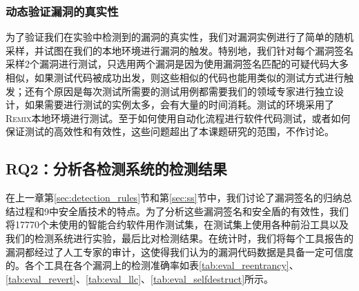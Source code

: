 \subsubsection{动态验证漏洞的真实性}

为了验证我们在实验中检测到的漏洞的真实性，我们对漏洞实例进行了简单的随机采样，并试图在我们的本地环境进行漏洞的触发。特别地，我们针对每个漏洞签名采样2个漏洞进行测试，只选用两个漏洞是因为使用漏洞签名匹配的可疑代码大多相似，如果测试代码被成功出发，则这些相似的代码也能用类似的测试方式进行触发；还有个原因是每次测试所需要的测试用例都需要我们的领域专家进行独立设计，如果需要进行测试的实例太多，会有大量的时间消耗。测试的环境采用了\textsc{Remix}本地环境进行测试。至于如何使用自动化流程进行软件代码测试，或者如何保证测试的高效性和有效性，这些问题超出了本课题研究的范围，不作讨论。

\subsection{RQ2：分析各检测系统的检测结果}

在上一章第\ref{sec:detection_rules}节和第\ref{sec:ss}节中，我们讨论了漏洞签名的归纳总结过程和9中安全盾技术的特点。为了分析这些漏洞签名和安全盾的有效性，我们将17770个未使用的智能合约软件用作测试集，在测试集上使用各种前沿工具以及我们的检测系统进行实验，最后比对检测结果。在统计时，我们将每个工具报告的漏洞都经过了人工专家的审计，这使得我们认为的漏洞代码数据是具备一定可信度的。各个工具在各个漏洞上的检测准确率如表\ref{tab:eval_reentrancy}、\ref{tab:eval_revert}、\ref{tab:eval_llc}、\ref{tab:eval_selfdestruct}所示。

